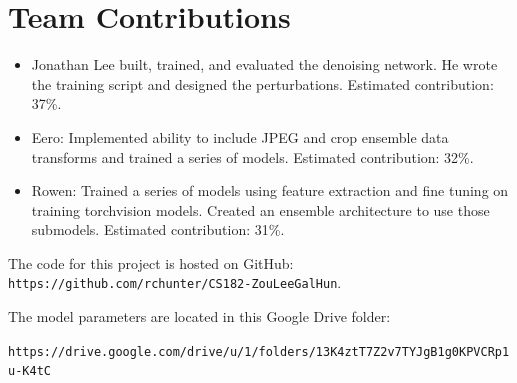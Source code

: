 \documentclass[justified]{article}
\begin{document}

  \section{Team Contributions}

  \begin{itemize}
  \item
    Jonathan Lee built, trained, and evaluated the denoising network.
    He wrote the training script and designed the perturbations.
    Estimated contribution: 37\%.

  \item
    Eero: Implemented ability to include JPEG and crop ensemble data transforms and trained a series of models.
    Estimated contribution: 32\%.

  \item
    Rowen: Trained a series of models using feature extraction and fine tuning on training torchvision models. Created an ensemble architecture to use those submodels.
    Estimated contribution: 31\%.
  \end{itemize}

  The code for this project is hosted on GitHub: \texttt{https://github.com/rchunter/CS182-ZouLeeGalHun}.

  The model parameters are located in this Google Drive folder:

  \texttt{https://drive.google.com/drive/u/1/folders/13K4ztT7Z2v7TYJgB1g0KPVCRp1u-K4tC}

  
  
\end{document}
